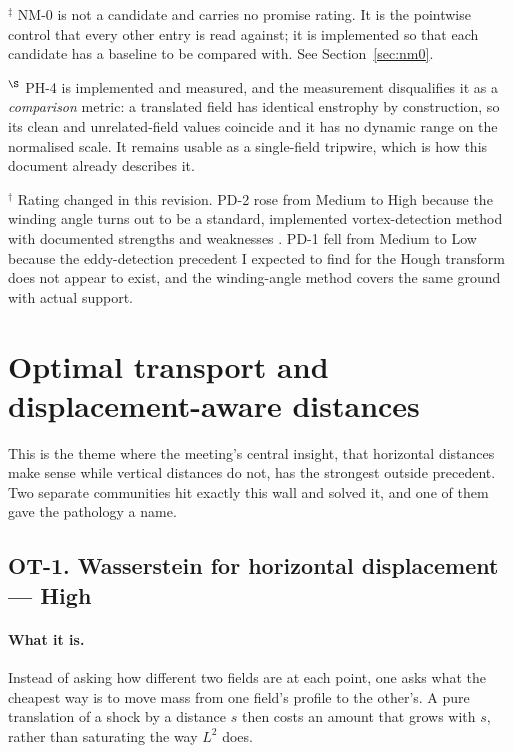 \documentclass[11pt]{article}
\newcommand{\High}{\textbf{High}}
\begin{document}
\noindent
$^\ddagger$ NM-0 is not a candidate and carries no promise rating. It is the pointwise
control that every other entry is read against; it is implemented so that each candidate has
a baseline to be compared with. See Section~\ref{sec:nm0}.

\noindent
$^\S$ PH-4 is implemented and measured, and the measurement disqualifies it as a
\emph{comparison} metric: a translated field has identical enstrophy by construction, so its
clean and unrelated-field values coincide and it has no dynamic range on the normalised
scale. It remains usable as a single-field tripwire, which is how this document already
describes it.

\noindent
$^\dagger$ Rating changed in this revision. PD-2 rose from Medium to High because the
winding angle turns out to be a standard, implemented vortex-detection method with
documented strengths and weaknesses \cite{sadarjoen2000}. PD-1 fell from Medium to Low
because the eddy-detection precedent I expected to find for the Hough transform does not
appear to exist, and the winding-angle method covers the same ground with actual support.

\section{Optimal transport and displacement-aware distances}

This is the theme where the meeting's central insight, that horizontal distances make
sense while vertical distances do not, has the strongest outside precedent. Two separate
communities hit exactly this wall and solved it, and one of them gave the pathology a name.

\subsection{OT-1. Wasserstein for horizontal displacement --- \High{}}

\paragraph{What it is.} Instead of asking how different two fields are at each point, one
asks what the cheapest way is to move mass from one field's profile to the other's. A pure
translation of a shock by a distance $s$ then costs an amount that grows with $s$, rather
than saturating the way $L^2$ does.
\end{document}
